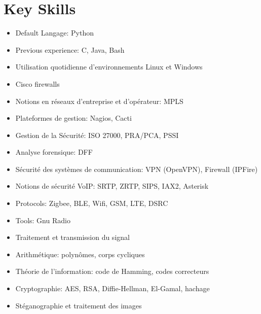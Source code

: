 \documentclass[11pt,a4paper,francais]{moderncv}
\begin{document}
\section{Key Skills}


{
\begin{itemize}
  \item Default Langage: Python
  \item Previous experience: C, Java, Bash 
\end{itemize}
}

{
\begin{itemize}
 \item Utilisation quotidienne d'environnements Linux et Windows
 \item Cisco firewalls
 \item Notions en réseaux d'entreprise et d'opérateur: MPLS 
 \item Plateformes de gestion: Nagios, Cacti
 \end{itemize}
}

{
\begin{itemize}
\item Gestion de la Sécurité: ISO 27000, PRA/PCA, PSSI
\item Analyse forensique: DFF 
\item Sécurité des systèmes de communication: VPN (OpenVPN), Firewall (IPFire)
\item Notions de sécurité VoIP: SRTP, ZRTP, SIPS, IAX2, Asterisk
\
\end{itemize}
}

{
\begin{itemize}
  \item Protocols: Zigbee, BLE, Wifi, GSM, LTE, DSRC
  \item Tools: Gnu Radio 
\end{itemize}
}

{
\begin{itemize}
 \item Traitement et transmission du signal
 \item Arithmétique: polynômes, corps cycliques
 \item Théorie de l'information: code de Hamming, codes correcteurs
 \item Cryptographie: AES, RSA, Diffie-Hellman, El-Gamal, hachage
 \item Stéganographie et traitement des images
\end{itemize}
}
\end{document}

